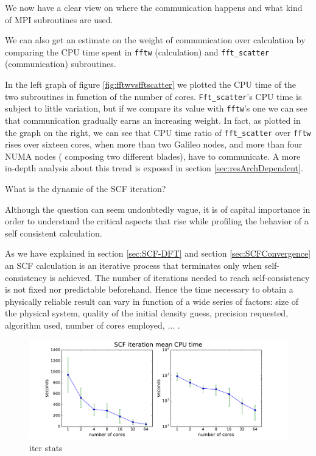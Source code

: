 \documentclass[a4paper,12pt]{article}
\begin{document}
We now have a clear view on where the communication happens and what kind of MPI subroutines are used.

We can also get an estimate on the weight of communication over calculation by comparing the CPU time spent in \texttt{fftw} (calculation) and \texttt{fft\_scatter} (communication) subroutines.

In the left graph of figure \ref{fig:fftwvsfftscatter} we plotted the CPU time of the two subroutines in function of the number of cores. 
\texttt{Fft\_scatter}'s CPU time is subject to little variation, but if we compare its value with \texttt{fftw}'s one we can see that communication gradually earns an increasing weight. 
In fact, as plotted in the graph on the right, we can see that CPU time ratio of \texttt{fft\_scatter} over \texttt{fftw} rises over sixteen cores, when more than two Galileo nodes, and more than four NUMA nodes ( composing two different blades), have to communicate.
A more in-depth analysis about this trend is exposed in section \ref{sec:resArchDependent}.


\newpage
\begin{center}
\begin{framed}
What is the dynamic of the SCF iteration?
\end{framed}
\end{center}

Although the question can seem undoubtedly vague, it is of capital importance in order to understand the critical aspects that rise  while profiling the behavior of a self consistent calculation.

As we have explained in section \ref{sec:SCF-DFT} and section \ref{sec:SCFConvergence} an SCF calculation is an iterative process that terminates only when self-consistency is achieved.
The number of iterations needed to reach self-consistency is not fixed nor predictable beforehand.
Hence the time necessary to obtain a physically reliable result can vary in function of a wide series of factors: size of the physical system, quality of the initial density guess, precision requested, algorithm used, number of cores employed, ... .


\begin{figure}[hhh!]
	\centerline{\includegraphics[width=1.2\linewidth]{iterstats.pdf}}
	\caption{ iter stats
	}
	\label{fig:iterstats}
\end{figure}
\end{document}
